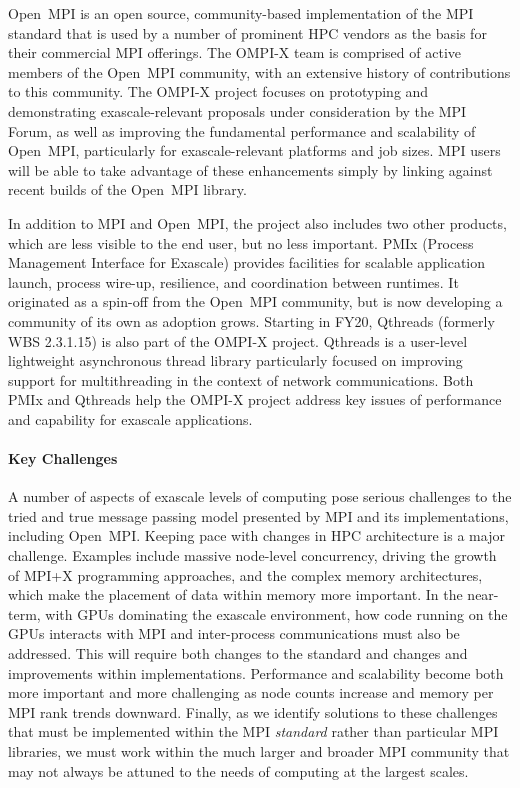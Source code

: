 Open~MPI is an open source, community-based implementation of the MPI
standard that is used by a number of prominent
HPC vendors as the basis for their commercial MPI offerings.   The
OMPI-X team is comprised of active members of the Open~MPI community,
with an extensive history of contributions to this community.
The OMPI-X project focuses on prototyping
and demonstrating exascale-relevant proposals under consideration by
the MPI Forum, as well as improving the fundamental performance and
scalability of Open~MPI, particularly for exascale-relevant platforms
and job sizes.
MPI users will be able to take advantage of these
enhancements simply by linking against recent builds of the Open~MPI
library.

In addition to MPI and Open~MPI, the project also includes two other products,
which are less visible to the end user, but no less important.
PMIx (Process Management Interface for Exascale) provides facilities for
scalable application launch, process wire-up, resilience, and coordination between runtimes.
It originated as a spin-off from the Open~MPI community, but is now developing a
community of its own as adoption grows.  Starting in FY20,
Qthreads (formerly WBS 2.3.1.15) is also part of the OMPI-X project.  Qthreads is a
user-level lightweight asynchronous thread library particularly focused on improving support for
multithreading in the context of network communications.  Both PMIx and Qthreads help the
OMPI-X project address key issues of performance and capability for exascale applications.


\paragraph{Key  Challenges}
A number of aspects of exascale levels
of computing pose serious challenges to the tried and true message
passing model presented by MPI and its implementations, including Open~MPI.
%
Keeping pace with changes in HPC architecture is a major challenge.
Examples include massive node-level concurrency, driving the
growth of MPI+X programming approaches,
and the complex memory architectures, which make the placement of data
within memory more important. In the near-term, with GPUs dominating the exascale
environment, how code running on the GPUs interacts with MPI and inter-process
communications must also be addressed.  This will require both changes to the standard
and changes and improvements within implementations.
%
Performance and scalability become both more important and more
challenging as node counts increase
and memory per MPI rank trends downward.
%
Finally, as we identify solutions to these challenges that must be
implemented within the MPI \emph{standard} rather than particular MPI libraries,
we must work within the much larger and broader MPI
community that may not always be attuned to the needs of computing at the largest scales.

